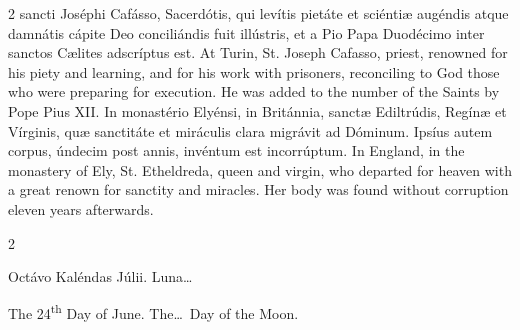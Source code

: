 \begin{paracol}{2}
 sancti Joséphi Cafásso, Sacerdótis, qui levítis pietáte et sciéntiæ augéndis 
 atque damnátis cápite Deo conciliándis fuit illústris, et a Pio Papa 
 Duodécimo inter sanctos Cælites adscríptus est.
\switchcolumn
{}
At Turin, St. Joseph Cafasso, 
 priest, renowned for his piety and learning, and for his work with 
 prisoners, reconciling to God those who were preparing for execution. 
 He was added to the number of the Saints by Pope Pius XII.
\switchcolumn*
{}
In monastério Elyénsi, 
 in Británnia, sanctæ Ediltrúdis, Regínæ et Vírginis, quæ sanctitáte et 
 miráculis clara migrávit ad Dóminum. Ipsíus autem corpus, úndecim post 
 annis, invéntum est incorrúptum.
\switchcolumn
{}
In England, in the monastery of Ely, 
 St. Etheldreda, queen and virgin, who departed for heaven with a great 
 renown for sanctity and miracles. Her body was found without 
 corruption eleven years afterwards.
\switchcolumn*
{}
\end{paracol}


\begin{paracol}{2}
\begin{center}{\color{gregoriocolor} Octávo Kaléndas Júlii. 
 Luna\dots\ }\end{center}
\switchcolumn
{}
\begin{center}{\color{gregoriocolor} The 
 24\textsuperscript{th} Day of 
 June. The\dots\ Day of the Moon.}\end{center}
\end{paracol}

